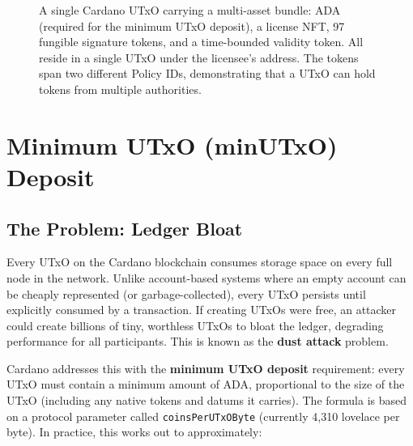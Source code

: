 \begin{figure}[htbp]
\caption{A single Cardano UTxO carrying a multi-asset bundle: ADA (required
for the minimum UTxO deposit), a license NFT, 97 fungible signature tokens,
and a time-bounded validity token. All reside in a single UTxO under the
licensee's address. The tokens span two different Policy IDs, demonstrating
that a UTxO can hold tokens from multiple authorities.}
\label{fig:multi-asset-utxo}
\end{figure}


\section{Minimum UTxO (minUTxO) Deposit}
\label{sec:min-utxo}

\subsection{The Problem: Ledger Bloat}

Every UTxO on the Cardano blockchain consumes storage space on every
full node in the network. Unlike account-based systems where an empty
account can be cheaply represented (or garbage-collected), every UTxO
persists until explicitly consumed by a transaction. If creating UTxOs
were free, an attacker could create billions of tiny, worthless UTxOs to
bloat the ledger, degrading performance for all participants. This is
known as the \textbf{dust attack} problem.

Cardano addresses this with the \textbf{minimum UTxO deposit}
requirement: every UTxO must contain a minimum amount of ADA,
proportional to the size of the UTxO (including any native tokens and
datums it carries). The formula is based on a protocol parameter called
\texttt{coinsPerUTxOByte} (currently 4,310 lovelace per byte). In
practice, this works out to approximately:

